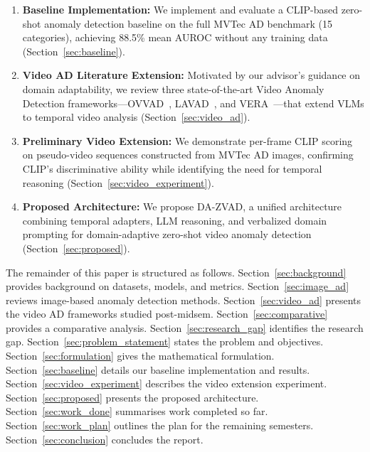 \documentclass[conference]{IEEEtran}
\begin{document}
\begin{enumerate}[leftmargin=*]
    \item \textbf{Baseline Implementation:} We implement and evaluate a CLIP-based zero-shot anomaly detection baseline on the full MVTec AD benchmark (15 categories), achieving 88.5\% mean AUROC without any training data (Section~\ref{sec:baseline}).

    \item \textbf{Video AD Literature Extension:} Motivated by our advisor's guidance on domain adaptability, we review three state-of-the-art Video Anomaly Detection frameworks---OVVAD~\cite{wu2024ovvad}, LAVAD~\cite{zanella2024lavad}, and VERA~\cite{ye2025vera}---that extend VLMs to temporal video analysis (Section~\ref{sec:video_ad}).

    \item \textbf{Preliminary Video Extension:} We demonstrate per-frame CLIP scoring on pseudo-video sequences constructed from MVTec AD images, confirming CLIP's discriminative ability while identifying the need for temporal reasoning (Section~\ref{sec:video_experiment}).

    \item \textbf{Proposed Architecture:} We propose DA-ZVAD, a unified architecture combining temporal adapters, LLM reasoning, and verbalized domain prompting for domain-adaptive zero-shot video anomaly detection (Section~\ref{sec:proposed}).
\end{enumerate}

The remainder of this paper is structured as follows. Section~\ref{sec:background} provides background on datasets, models, and metrics. Section~\ref{sec:image_ad} reviews image-based anomaly detection methods. Section~\ref{sec:video_ad} presents the video AD frameworks studied post-midsem. Section~\ref{sec:comparative} provides a comparative analysis. Section~\ref{sec:research_gap} identifies the research gap. Section~\ref{sec:problem_statement} states the problem and objectives. Section~\ref{sec:formulation} gives the mathematical formulation. Section~\ref{sec:baseline} details our baseline implementation and results. Section~\ref{sec:video_experiment} describes the video extension experiment. Section~\ref{sec:proposed} presents the proposed architecture. Section~\ref{sec:work_done} summarises work completed so far. Section~\ref{sec:work_plan} outlines the plan for the remaining semesters. Section~\ref{sec:conclusion} concludes the report.

\end{document}
